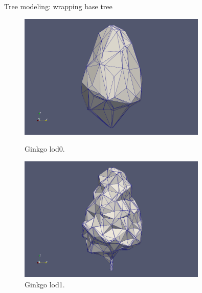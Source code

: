 \documentclass[10pt]{beamer}
\begin{document}
\begin{frame}{Tree modeling: wrapping base tree}
  \begin{figure}[H]
    \centering
    \begin{minipage}{0.49\textwidth}
        \centering
        \includegraphics[width=0.8\textwidth]{images/gingko_lod0.png}
        \caption{Ginkgo lod0.}
    \end{minipage}\hfill
    \begin{minipage}{0.49\textwidth}
        \centering
        \includegraphics[width=0.8\textwidth]{images/gingko_lod1.png}
        \caption{Ginkgo lod1.}
    \end{minipage}
\end{figure}


\end{frame}
\end{document}
